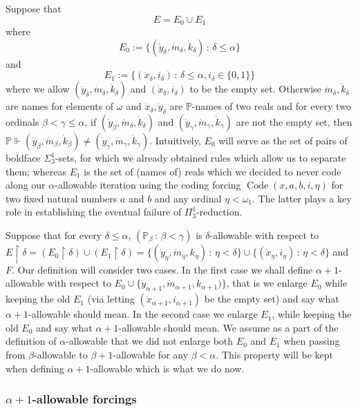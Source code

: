 \documentclass[a4paper,11pt]{article}
\newcommand{\forceP}{\mathbb{P}}
\begin{document}
Suppose that 
\[E= E_0 \cup E_1 \] 
where\[ E_0:= \{(\dot{y}_{\delta}, \dot{m}_{\delta} ,\dot{k}_{\delta}) \, : \,  \delta \le \alpha\} \]
and 
\[E_1 := \{(\dot{x}_{\delta},i_{\delta} ) \, : \,\delta \le \alpha, i_{\delta} \in \{0,1\} \} \]
where we allow $(\dot{y}_{\delta}, \dot{m}_{\delta} ,\dot{k}_{\delta})$ and $(\dot{x}_{\delta},i_{\delta} )$ to be the empty set. Otherwise  $\dot{m}_{\delta},\dot{k}_{\delta} $ are names for elements of $ \omega$ and $\dot{x}_{\delta}, \dot{y}_{\delta}$ are $\forceP$-names of two reals and for every two ordinals $\beta < \gamma \le  \alpha$,  if $(\dot{y}_{\beta}, \dot{m}_{\delta},\dot{k}_{\delta})$ and $(\dot{y}_{\gamma},\dot{m}_{\gamma},\dot{k}_{\gamma})$ are not the empty set, then $\forceP \Vdash (\dot{y}_{\beta}, \dot{m}_{\beta},\dot{k}_{\beta}) \ne (\dot{y}_{\gamma},\dot{m}_{\gamma},\dot{k}_{\gamma})$. Intuitively, $E_0$ will serve as the set of pairs of boldface $\Sigma^1_3$-sets, for which we already obtained rules which allow us to separate them; whereas $E_1$ is the set of (names of) reals which we decided to never code along our $\alpha$-allowable iteration using the coding forcing $\operatorname{Code}(x,a,b,i,\eta)$ for two fixed natural numbers $a$ and $b$ and any ordinal $\eta < \omega_1$. The latter plays a key role in establishing the eventual failure of $\Pi^1_3$-reduction.


Suppose that for every $\delta \le \alpha$, $(\forceP_{\beta} \, : \, \beta < \gamma )$ is $\delta$-allowable with respect to $E \upharpoonright \delta =  (E_0 \upharpoonright \delta) \cup (E_1 \upharpoonright \delta ) =\{ ( \dot{y}_{\eta},\dot{m}_{\eta},k_{\eta})  \, : \, \eta < \delta \} \cup \{ (\dot{x}_{\eta}, i_{\eta} ) \, : \, \eta < \delta\}$ and $F$. Our definition will consider two cases. In the first case we shall define $\alpha+1$-allowable with respect to $E_0 \cup \{\dot{y}_{\alpha+1}, \dot{m}_{\alpha+1},\dot{k}_{\alpha+1} ) \}$, that is we enlarge $E_0$ while keeping the old $E_1$ (via letting $(\dot{x}_{\alpha+1}, i_{\alpha+1})$ be the empty set) and say what $\alpha+1$-allowable should mean. In the second case we enlarge $E_1$, while keeping the old $E_0$ and say what $\alpha+1$-allowable should mean. We assume as a part of the definition of $\alpha$-allowable that we did not enlarge both $E_0$ and $E_1$ when passing from $\beta$-allowable to $\beta+1$-allowable for any $\beta < \alpha$. This property will be kept when defining $\alpha+1$-allowable which is what we do now.


\subsubsection{$\alpha+1$-allowable forcings}
\end{document}
